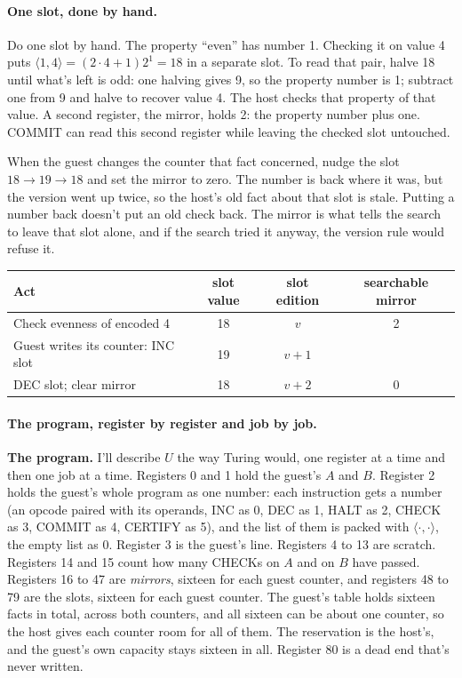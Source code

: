 \documentclass[11pt,twoside]{article}
\theoremstyle{thielethm}
\theoremstyle{thieledef}
\theoremstyle{thieledef}
\theoremstyle{thieledef}
\theoremstyle{thielethm}
\theoremstyle{thieleobs}
\theoremstyle{thielethm}
\begin{document}
\paragraph{One slot, done by hand.}
Do one slot by hand. The property ``even'' has number 1. Checking it on value 4
puts $\langle1,4\rangle=(2\cdot4+1)2^1=18$ in a separate slot. To read that
pair, halve 18 until what's left is odd: one halving gives 9, so the
property number is 1; subtract one from 9 and halve to recover value 4. The host
checks that property of that value. A second register, the mirror, holds 2: the property
number plus one. COMMIT can read this second register while leaving the checked slot
untouched.

When the guest changes the counter that fact concerned, nudge the slot
$18\to19\to18$ and set the mirror to zero. The number is back where it was, but the version
went up twice, so the host's old fact about that slot is stale. Putting a number back
doesn't put an old check back. The mirror is what tells the search to leave that slot alone,
and if the search tried it anyway, the version rule would refuse it.

\begin{center}
\small
\begin{tabular}{@{}lccc@{}}
Act & slot value & slot edition & searchable mirror \\ \hline
Check evenness of encoded 4 & 18 & $v$ & 2 \\
Guest writes its counter: INC slot & 19 & $v+1$ & \\
DEC slot; clear mirror & 18 & $v+2$ & 0 \\ \hline
\end{tabular}
\end{center}

\paragraph{The program, register by register and job by job.}
\textbf{The program.} I'll describe $U$ the way Turing would, one register at a time and then
one job at a time. Registers 0 and 1 hold the guest's $A$ and $B$. Register 2 holds the guest's
whole program as one number: each instruction gets a number (an opcode paired with its operands,
INC as 0, DEC as 1, HALT as 2, CHECK as 3, COMMIT as 4, CERTIFY as 5), and the list of them is
packed with $\langle \cdot, \cdot \rangle$, the empty list as 0. Register 3 is the guest's line.
Registers 4 to 13 are scratch. Registers 14 and 15 count how many CHECKs on $A$ and on $B$ have
passed. Registers 16 to 47 are \emph{mirrors}, sixteen for each guest counter, and registers 48 to
79 are the slots, sixteen for each guest counter. The guest's table holds sixteen facts in
total, across both counters, and all sixteen can be about one counter, so the host gives each
counter room for all of them. The reservation is the host's, and the guest's own capacity stays
sixteen in all. Register
80 is a dead end that's never written.
\end{document}
